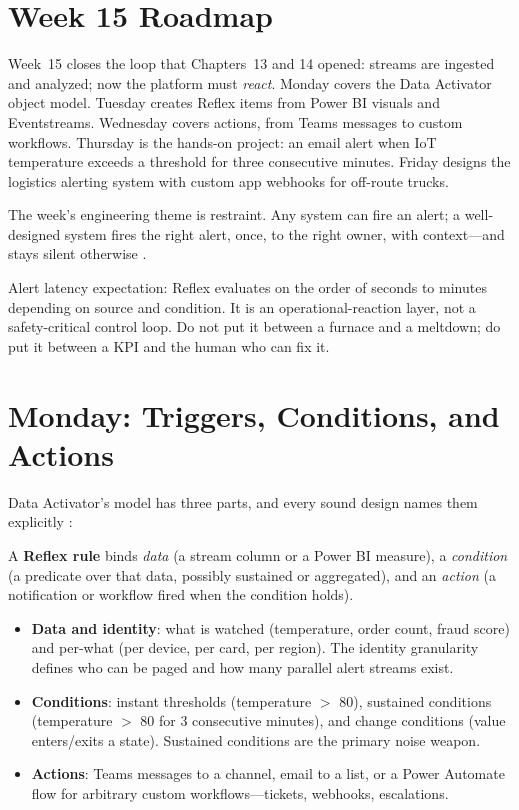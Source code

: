\section{Week 15 Roadmap}
Week~15 closes the loop that Chapters~13 and 14 opened: streams are ingested and analyzed; now the platform must \emph{react}. Monday covers the Data Activator object model. Tuesday creates Reflex items from Power BI visuals and Eventstreams. Wednesday covers actions, from Teams messages to custom workflows. Thursday is the hands-on project: an email alert when IoT temperature exceeds a threshold for three consecutive minutes. Friday designs the logistics alerting system with custom app webhooks for off-route trucks.

The week's engineering theme is restraint. Any system can fire an alert; a well-designed system fires the right alert, once, to the right owner, with context---and stays silent otherwise \cite{microsoftDataActivator}.

\begin{notebox}
Alert latency expectation: Reflex evaluates on the order of seconds to minutes depending on source and condition. It is an operational-reaction layer, not a safety-critical control loop. Do not put it between a furnace and a meltdown; do put it between a KPI and the human who can fix it.
\end{notebox}

\section{Monday: Triggers, Conditions, and Actions}
Data Activator's model has three parts, and every sound design names them explicitly \cite{microsoftDataActivator}:

\begin{definitionbox}
A \textbf{Reflex rule} binds \emph{data} (a stream column or a Power BI measure), a \emph{condition} (a predicate over that data, possibly sustained or aggregated), and an \emph{action} (a notification or workflow fired when the condition holds).
\end{definitionbox}

\begin{itemize}
    \item \textbf{Data and identity}: what is watched (temperature, order count, fraud score) and per-what (per device, per card, per region). The identity granularity defines who can be paged and how many parallel alert streams exist.
    \item \textbf{Conditions}: instant thresholds (temperature $>$ 80), sustained conditions (temperature $>$ 80 for 3 consecutive minutes), and change conditions (value enters/exits a state). Sustained conditions are the primary noise weapon.
    \item \textbf{Actions}: Teams messages to a channel, email to a list, or a Power Automate flow for arbitrary custom workflows---tickets, webhooks, escalations.
\end{itemize}

